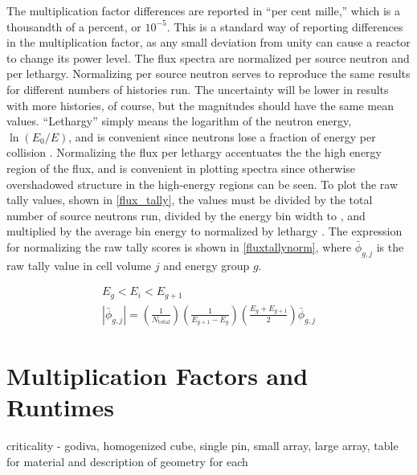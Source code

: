 The multiplication factor differences are reported in ``per cent mille,'' which is a thousandth of a percent, or $10^{-5}$.  This is a standard way of reporting differences in the multiplication factor, as any small deviation from unity can cause a reactor to change its power level.  The flux spectra are normalized per source neutron and per lethargy.  Normalizing per source neutron serves to reproduce the same results for different numbers of histories run.  The uncertainty will be lower in results with more histories, of course, but the magnitudes should have the same mean values.   ``Lethargy'' simply means the logarithm of the neutron energy, $\ln(E_0/E)$, and is convenient since neutrons lose a fraction of energy per collision \cite{duderstadt}.  Normalizing the flux per lethargy accentuates the the high energy region of the flux, and is convenient in plotting spectra since otherwise overshadowed structure in the high-energy regions can be seen.  To plot the raw tally values, shown in \eqref{flux_tally}, the values must be divided by the total number of source neutrons run, divided by the energy bin width to , and multiplied by the average bin energy to normalized by lethargy \cite{lethargyplot}.  The expression for normalizing the raw tally scores is shown in \eqref{fluxtallynorm}, where $\bar{\phi}_{g,j}$ is the raw tally value in cell volume $j$ and energy group $g$.

\begin{equation}
\label{fluxtallynorm}
\begin{gathered}
E_g < E_i < E_{g+1} \\
|\bar{\phi}_{g,j}| = \left( \frac{1}{N_\mathrm{total}}\right) \left(\frac{1}{E_{g+1}-E_g}\right) \left(\frac{E_g+E_{g+1}}{2} \right) \bar{\phi}_{g,j}
\end{gathered}
\end{equation}

\section{Multiplication Factors and Runtimes}

criticality - godiva, homogenized cube, single pin,  small array, large array, table for material and description of geometry for each

